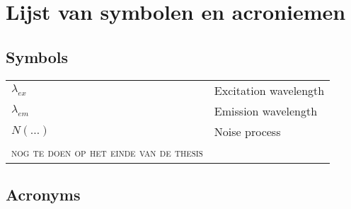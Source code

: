 \chapter*{Lijst van symbolen en acroniemen}

\section*{Symbols}


\begin{longtable}{ll}
$\lambda_{ex}$  &       Excitation wavelength\\
$\lambda_{em}$  &	Emission wavelength\\
$N(\ldots)$	&	Noise process\\
\textsc{nog te doen op het einde van de thesis}
\end{longtable}


\section*{Acronyms}

